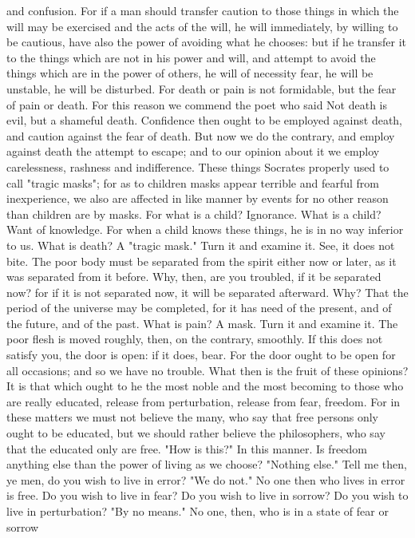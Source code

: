 \documentclass[a4paper]{article}
\begin{document}
and confusion. For if a man should transfer caution to those things in which
the will may be exercised and the acts of the will, he will immediately, by
willing to be cautious, have also the power of avoiding what he chooses: but if
he transfer it to the things which are not in his power and will, and attempt
to avoid the things which are in the power of others, he will of necessity
fear, he will be unstable, he will be disturbed. For death or pain is not
formidable, but the fear of pain or death. For this reason we commend the poet
who said
       Not death is evil, but a shameful death.
Confidence then ought to be employed against death, and caution against the
fear of death. But now we do the contrary, and employ against death the attempt
to escape; and to our opinion about it we employ carelessness, rashness and
indifference. These things Socrates properly used to call "tragic masks"; for
as to children masks appear terrible and fearful from inexperience, we also are
affected in like manner by events for no other reason than children are by
masks. For what is a child? Ignorance. What is a child? Want of knowledge. For
when a child knows these things, he is in no way inferior to us. What is death?
A "tragic mask." Turn it and examine it. See, it does not bite. The poor body
must be separated from the spirit either now or later, as it was separated from
it before. Why, then, are you troubled, if it be separated now? for if it is
not separated now, it will be separated afterward. Why? That the period of the
universe may be completed, for it has need of the present, and of the future,
and of the past. What is pain? A mask. Turn it and examine it. The poor flesh
is moved roughly, then, on the contrary, smoothly. If this does not satisfy
you, the door is open: if it does, bear. For the door ought to be open for all
occasions; and so we have no trouble.
    What then is the fruit of these opinions? It is that which ought to he the
most noble and the most becoming to those who are really educated, release from
perturbation, release from fear, freedom. For in these matters we must not
believe the many, who say that free persons only ought to be educated, but we
should rather believe the philosophers, who say that the educated only are
free. "How is this?" In this manner. Is freedom anything else than the power of
living as we choose? "Nothing else." Tell me then, ye men, do you wish to live
in error? "We do not." No one then who lives in error is free. Do you wish to
live in fear? Do you wish to live in sorrow? Do you wish to live in
perturbation? "By no means." No one, then, who is in a state of fear or sorrow
\end{document}

